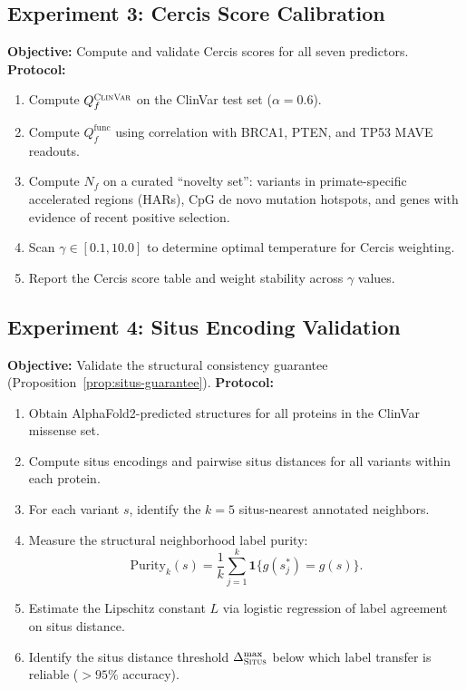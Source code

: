 \documentclass[11pt,a4paper]{article}
\theoremstyle{definition}
\newcommand{\ind}{\mathbf{1}}
\newcommand{\situs}{\textsc{Situs}}
\newcommand{\ClinVar}{\textsc{ClinVar}}
\begin{document}
\subsection{Experiment 3: Cercis Score Calibration}
\textbf{Objective:} Compute and validate Cercis scores for all seven predictors.
\textbf{Protocol:}
\begin{enumerate}[leftmargin=*]
    \item Compute $Q_f^{\ClinVar}$ on the ClinVar test set ($\alpha = 0.6$).
    \item Compute $Q_f^{\text{func}}$ using correlation with BRCA1, PTEN, and TP53 MAVE readouts.
    \item Compute $N_f$ on a curated ``novelty set'': variants in primate-specific accelerated regions (HARs), CpG de novo mutation hotspots, and genes with evidence of recent positive selection.
    \item Scan $\gamma \in [0.1, 10.0]$ to determine optimal temperature for Cercis weighting.
    \item Report the Cercis score table and weight stability across $\gamma$ values.
\end{enumerate}
\subsection{Experiment 4: Situs Encoding Validation}
\textbf{Objective:} Validate the structural consistency guarantee (Proposition~\ref{prop:situs-guarantee}).
\textbf{Protocol:}
\begin{enumerate}[leftmargin=*]
    \item Obtain AlphaFold2-predicted structures for all proteins in the ClinVar missense set.
    \item Compute situs encodings and pairwise situs distances for all variants within each protein.
    \item For each variant $s$, identify the $k = 5$ situs-nearest annotated neighbors.
    \item Measure the structural neighborhood label purity:
    \begin{equation}
        \text{Purity}_k(s) = \frac{1}{k}\sum_{j=1}^{k} \ind\{g(s_j^*) = g(s)\}.
    \end{equation}
    \item Estimate the Lipschitz constant $L$ via logistic regression of label agreement on situs distance.
    \item Identify the situs distance threshold $\Delta_{\situs}^{\max}$ below which label transfer is reliable ($>95\%$ accuracy).
\end{enumerate}
\end{document}
